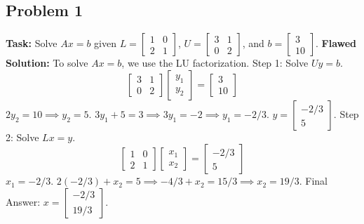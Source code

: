 \documentclass[11pt]{article}
\begin{document}
\subsection{Problem 1}
\textbf{Task:} Solve $Ax = b$ given $L = \begin{bmatrix} 1 & 0 \\ 2 & 1 \end{bmatrix}$, $U = \begin{bmatrix} 3 & 1 \\ 0 & 2 \end{bmatrix}$, and $b = \begin{bmatrix} 3 \\ 10 \end{bmatrix}$.
\textbf{Flawed Solution:}
To solve $Ax = b$, we use the LU factorization.
Step 1: Solve $Uy = b$.
\[ \begin{bmatrix} 3 & 1 \\ 0 & 2 \end{bmatrix} \begin{bmatrix} y_1 \\ y_2 \end{bmatrix} = \begin{bmatrix} 3 \\ 10 \end{bmatrix} \]
$2y_2 = 10 \implies y_2 = 5$.
$3y_1 + 5 = 3 \implies 3y_1 = -2 \implies y_1 = -2/3$.
$y = \begin{bmatrix} -2/3 \\ 5 \end{bmatrix}$.
Step 2: Solve $Lx = y$.
\[ \begin{bmatrix} 1 & 0 \\ 2 & 1 \end{bmatrix} \begin{bmatrix} x_1 \\ x_2 \end{bmatrix} = \begin{bmatrix} -2/3 \\ 5 \end{bmatrix} \]
$x_1 = -2/3$.
$2(-2/3) + x_2 = 5 \implies -4/3 + x_2 = 15/3 \implies x_2 = 19/3$.
Final Answer: $x = \begin{bmatrix} -2/3 \\ 19/3 \end{bmatrix}$.
\end{document}
